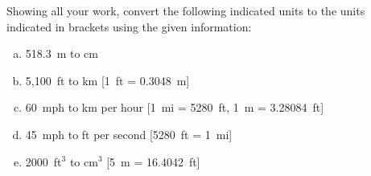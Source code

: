\documentclass[11pt,letterpaper]{article}
\begin{document}

 Showing all your work, convert the following indicated units to the units indicated in brackets using the given information:
	\begin{enumerate}[(a)]
	\item 518.3~m to cm
	\item 5,100~ft to km [1~ft = 0.3048~m]
	\item 60~mph to km per hour [1~mi = 5280~ft, 1~m = 3.28084~ft]
	\item 45~mph to ft per second [5280~ft = 1~mi]
	\item 2000~ft$^3$ to cm$^3$ [5~m = 16.4042~ft]
	\end{enumerate} \pspace
\end{document}
